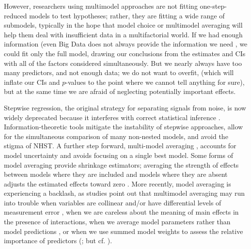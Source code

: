 \documentclass[entropy,article,accept,pdftex,moreauthors]{Definitions/mdpi}
\begin{document}
However, researchers using multimodel approaches are not fitting
one-step-reduced models to test hypotheses; rather, they are fitting a
wide range of submodels, typically in the hope that model choice or
multimodel averaging will help them deal with insufficient data in a
multifactorial world. If we had enough information (even Big Data
does not always provide the information we need \cite{ref-mengStatistical2018}, we could
fit only the full model, drawing our conclusions from the estimates and
CIs with all of the factors considered simultaneously. But we nearly
always have too many predictors, and not enough data; we do not want to
overfit, (which will inflate our CIs and \(p\)-values to the point where
we cannot tell anything for sure), but at the same time we are afraid of
neglecting potentially important effects.

Stepwise regression, the original strategy for separating signals from
noise, is now widely deprecated because it interferes with correct
statistical inference \cite{ref-harrell_regression_2001,ref-romanoStepwise2005,ref-whittingham_why_2006,ref-mundryStepwise2009}. Information-theoretic tools mitigate
the instability of stepwise approaches, allow for the simultaneous comparison of
many non-nested models, and avoid the stigma of NHST. A further step
forward, multi-model averaging \cite{ref-burnham_model_2002}, accounts for
model uncertainty and avoids focusing on a single best model. Some forms
of model averaging provide {shrinkage estimators}; averaging the
strength of effects between models where they are included and models
where they are absent adjusts the estimated effects toward zero \cite{ref-cade_model_2015}. More recently, model averaging is experiencing a backlash, as
studies point out that multimodel averaging may run into trouble when
variables are collinear and/or have differential levels of measurement
error \cite{ref-freckleton_dealing_2011}, when we are careless about the meaning of
main effects in the presence of interactions, when we average model
parameters rather than model predictions \cite{ref-cade_model_2015}, or when we use
summed model weights to assess the relative importance of predictors
(\cite{ref-galipaud_ecologists_2014,ref-cade_model_2015}; but cf. \cite{ref-zhang_model_2015}).
\end{document}
